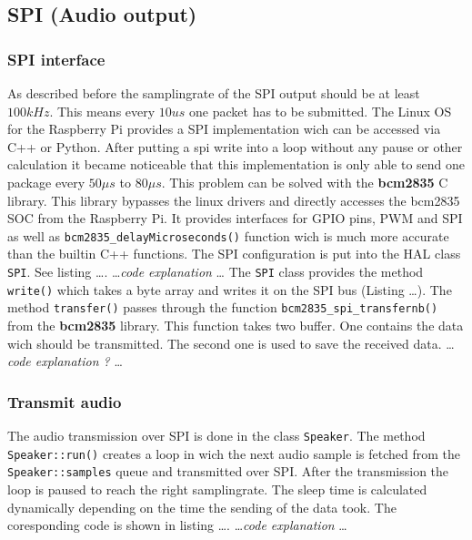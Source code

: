 \subsection{SPI (Audio output)}

\subsubsection*{SPI interface}

As described before the samplingrate of the SPI output should be at least $100kHz$. This means every $10us$ one packet has to be submitted. The Linux OS for the Raspberry Pi provides a SPI implementation wich can be accessed via C++ or Python. After putting a spi write into a loop without any pause or other calculation it became noticeable that this implementation is only able to send one package every $50\mu s$ to $80\mu s$. This problem can be solved with the \textbf{bcm2835} C library. This library bypasses the linux drivers and directly accesses the bcm2835 SOC from the Raspberry Pi. It provides interfaces for GPIO pins, PWM and SPI as well as \lstinline{bcm2835_delayMicroseconds()} function wich is much more accurate than the builtin C++ functions.\p
%
The SPI configuration is put into the HAL class \lstinline{SPI}. See listing \dots.\p
\dots \textit{code explanation} \dots\p
%
The \lstinline{SPI} class provides the method \lstinline{write()} which takes a byte array and writes it on the SPI bus (Listing \dots). The method \lstinline{transfer()} passes through the function \lstinline{bcm2835_spi_transfernb()} from the \textbf{bcm2835} library. This function takes two buffer. One contains the data wich should be transmitted. The second one is used to save the received data.\p
\dots \textit{code explanation ?} \dots\p

\subsubsection*{Transmit audio}

The audio transmission over SPI is done in the class \lstinline{Speaker}. The method \lstinline{Speaker::run()} creates a loop in wich the next audio sample is fetched from the \lstinline{Speaker::samples} queue and transmitted over SPI. After the transmission the loop is paused to reach the right samplingrate. The sleep time is calculated dynamically depending on the time the sending of the data took. The coresponding code is shown in listing \dots.\p
\dots \textit{code explanation} \dots\p

